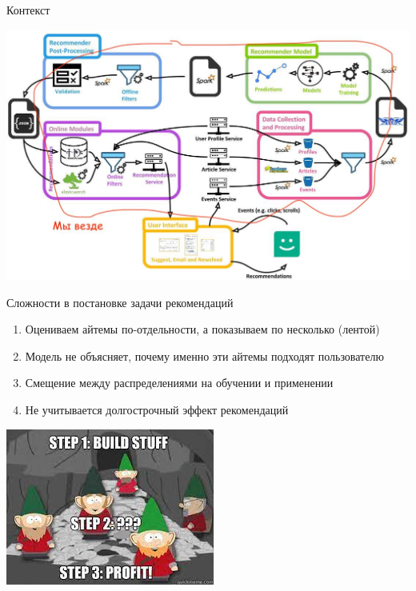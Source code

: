 \documentclass[11pt,aspectratio=169,handout]{beamer}
\author{Николай Анохин}
\title{Recommendations + Reinforcement Learning = \ensuremath\heartsuit}
\begin{document}
{

\begin{frame}
\titlepage
\end{frame}


}

\begin{frame}{Контекст}

\begin{center}
\includegraphics[scale=0.23]{images/mendeley.jpeg}
\end{center}

\end{frame}

\begin{frame}{Сложности в постановке задачи рекомендаций}

\begin{enumerate}
\item Оцениваем айтемы по-отдельности, а показываем по несколько (лентой)
\item Модель не объясняет, почему именно эти айтемы подходят пользователю
\item Смещение между распределениями на обучении и применении
\item {\color{blue} Не учитывается долгострочный эффект рекомендаций}
\end{enumerate}

\begin{center}
\includegraphics[scale=0.4]{images/profit.jpeg}
\end{center}

\end{frame}
\end{document}
